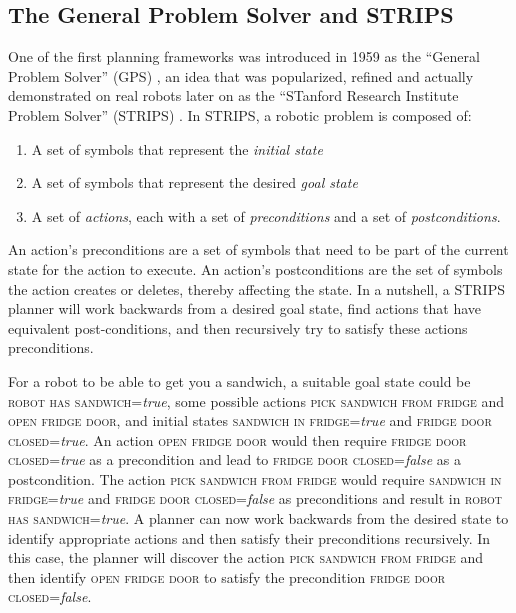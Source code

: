 \subsection{The General Problem Solver and STRIPS}

One of the first planning frameworks was introduced in 1959 as the ``General Problem Solver'' (GPS) \cite{newell1959report}, an idea that was popularized, refined and actually demonstrated on real robots later on as the ``STanford Research Institute Problem Solver'' (STRIPS) \cite{fikes1971strips}.
%
In STRIPS, a robotic problem is composed of:

\begin{enumerate}
\item A set of symbols that represent the \textsl{initial state}
\item A set of symbols that represent the desired \textsl{goal state}
\item A set of \textsl{actions}, each with a set of \textsl{preconditions} and a set of \textsl{postconditions}.
\end{enumerate}

An action's preconditions are a set of symbols that need to be part of the current state for the action to execute. An action's postconditions are the set of symbols the action creates or deletes, thereby affecting the state. In a nutshell, a STRIPS planner will work backwards from a desired goal state, find actions that have equivalent post-conditions, and then recursively try to satisfy these actions preconditions.

For a robot to be able to get you a sandwich, a suitable goal state could be \textsc{robot has sandwich}=\textsl{true}, some possible actions \textsc{pick sandwich from fridge} and \textsc{open fridge door}, and initial states \textsc{sandwich in fridge}=\textsl{true} and \textsc{fridge door closed}=\textsl{true}.  An action \textsc{open fridge door} would then require \textsc{fridge door closed}=\textsl{true} as a precondition and lead to \textsc{fridge door closed}=\textsl{false} as a postcondition. The action \textsc{pick sandwich from fridge} would require \textsc{sandwich in fridge}=\textsl{true} and \textsc{fridge door closed}=\textsl{false} as preconditions and result in \textsc{robot has sandwich}=\textsl{true}. A planner can now work backwards from the desired state to identify appropriate actions and then satisfy their preconditions recursively. In this case, the planner will discover the action \textsc{pick sandwich from fridge} and then identify \textsc{open fridge door} to satisfy the precondition \textsc{fridge door closed}=\textsl{false}.

